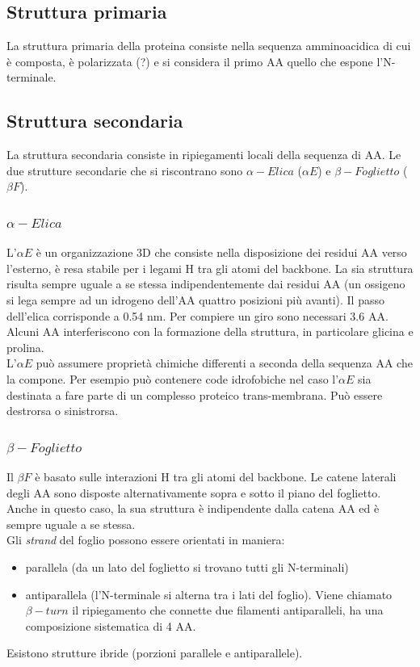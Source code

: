     
    \subsection{Struttura primaria}
        La struttura primaria della proteina consiste nella sequenza amminoacidica di cui è composta, è polarizzata (?) e si considera il primo AA quello che espone l'N-terminale.
    
    
    \subsection{Struttura secondaria}
        La struttura secondaria consiste in ripiegamenti locali della sequenza di AA. Le due strutture secondarie che si riscontrano sono $\alpha -Elica$ ($\alpha E$) e $\beta -Foglietto$ ($\beta F$). 
        
        \subsubsection{$\alpha -Elica$}
            L'$\alpha E$ è un organizzazione 3D che consiste nella disposizione dei residui AA verso l'esterno, è resa stabile per i legami H tra gli atomi del backbone. 
            La sia struttura risulta sempre uguale a se stessa indipendentemente dai residui AA (un ossigeno si lega sempre ad un idrogeno dell'AA quattro posizioni più avanti). Il passo dell'elica corrisponde a 0.54 nm. Per compiere un giro sono necessari 3.6 AA.\\
            Alcuni AA interferiscono con la formazione della struttura, in particolare glicina e prolina.\\
            L'$\alpha E$ può assumere proprietà chimiche differenti a seconda della sequenza AA che la compone. Per esempio può contenere code idrofobiche nel caso l'$\alpha E$ sia destinata a fare parte di un complesso proteico trans-membrana.
            Può essere destrorsa o sinistrorsa.
        
        \subsubsection{$\beta -Foglietto$}
            Il $\beta F$ è basato sulle interazioni H tra gli atomi del backbone. Le catene laterali degli AA sono disposte alternativamente sopra e sotto il piano del foglietto. Anche in questo caso, la sua struttura è indipendente dalla catena AA ed è sempre uguale a se stessa. \\
            Gli \textit{strand} del foglio possono essere orientati in maniera:
            \begin{itemize}
                \item parallela (da un lato del foglietto si trovano tutti gli N-terminali)
                \item antiparallela (l'N-terminale si alterna tra i lati del foglio). 
                Viene chiamato $\beta -turn$ il ripiegamento che connette due filamenti antiparalleli, ha una composizione sistematica di 4 AA.
            \end{itemize}
            Esistono strutture ibride (porzioni parallele e antiparallele).
        

